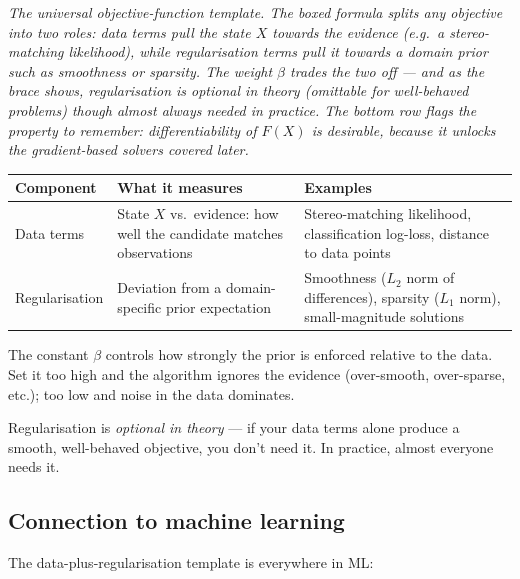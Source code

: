 \documentclass[11pt, a4paper]{article}
\newcommand{\thead}[1]{\textbf{#1}}
\begin{document}
\begin{center}

\footnotesize\textit{The universal objective-function template. The boxed formula splits any objective into two roles: \emph{data terms} pull the state $X$ towards the evidence (e.g.\ a stereo-matching likelihood), while \emph{regularisation terms} pull it towards a domain prior such as smoothness or sparsity. The weight $\beta$ trades the two off --- and as the brace shows, regularisation is \emph{optional in theory} (omittable for well-behaved problems) though almost always needed in practice. The bottom row flags the property to remember: \emph{differentiability of $F(X)$ is desirable}, because it unlocks the gradient-based solvers covered later.}
\end{center}

\begin{center}
\renewcommand{\arraystretch}{1.25}
\begin{tabular}{@{}p{4cm}p{5cm}p{5.5cm}@{}}
\toprule
\thead{Component} & \thead{What it measures} & \thead{Examples} \\
\midrule
Data terms & State $X$ vs.\ evidence: how well the candidate matches observations & Stereo-matching likelihood, classification log-loss, distance to data points \\
Regularisation & Deviation from a domain-specific prior expectation & Smoothness ($L_2$ norm of differences), sparsity ($L_1$ norm), small-magnitude solutions \\
\bottomrule
\end{tabular}
\end{center}

The constant $\beta$ controls how strongly the prior is enforced relative to the data. Set it too high and the algorithm ignores the evidence (over-smooth, over-sparse, etc.); too low and noise in the data dominates.

Regularisation is \emph{optional in theory} — if your data terms alone produce a smooth, well-behaved objective, you don't need it. In practice, almost everyone needs it.

\subsection{Connection to machine learning}

The data-plus-regularisation template is everywhere in ML:
\end{document}
